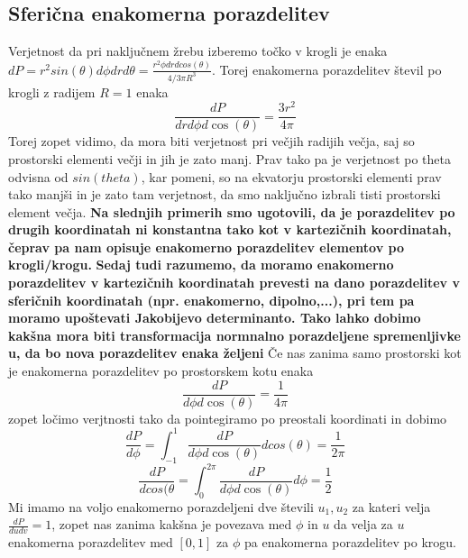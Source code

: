 \documentclass[11pt, a4paper]{article}
\begin{document}
\subsection{Sferična enakomerna porazdelitev}
Verjetnost da pri naključnem žrebu izberemo točko v krogli je enaka $dP  = r^2 sin ( \theta ) d \phi dr d \theta =\frac{ r^2 \phi dr d cos( \theta)} {4/3 \pi R^3} $. Torej enakomerna porazdelitev števil po krogli z radijem $R=1$ enaka 
\begin{equation}
\frac{dP}{dr d \phi  d \cos( \theta )}  = \frac{3 r^2}{4 \pi}
\end{equation} 
Torej zopet vidimo, da mora biti verjetnost pri večjih radijih večja, saj so prostorski elementi večji in jih je zato manj. Prav tako pa je verjetnost po theta odvisna od $sin(theta)$, kar pomeni, so na ekvatorju prostorski elementi prav tako manjši in je zato tam verjetnost, da smo naključno izbrali tisti prostorski element večja. \newline\newline
\textbf{Na slednjih primerih smo ugotovili, da je porazdelitev po drugih koordinatah ni konstantna tako kot v kartezičnih koordinatah, čeprav pa nam opisuje enakomerno porazdelitev elementov po krogli/krogu.}\newline\newline
\textbf{Sedaj tudi razumemo, da moramo enakomerno porazdelitev v kartezičnih koordinatah prevesti na dano porazdelitev v sferičnih koordinatah (npr. enakomerno, dipolno,...), pri tem pa moramo upoštevati Jakobijevo determinanto. Tako lahko dobimo kakšna mora biti transformacija normnalno porazdeljene spremenljivke u, da bo nova porazdelitev enaka željeni}\newline\newline
Če nas zanima samo prostorski kot je enakomerna porazdelitev po prostorskem kotu enaka 
\begin{equation}
\frac{dP}{d \phi d \cos( \theta )} = \frac{1}{4 \pi}
\end{equation}
zopet ločimo verjtnosti tako da pointegiramo po preostali koordinati in dobimo
\begin{equation}
\frac{dP}{d \phi} = \int_{-1}^{1}\frac{dP}{d \phi d \cos( \theta )} d cos( \theta) = \frac{1}{2 \pi}
\end{equation}
\begin{equation}
\frac{dP}{d cos( \theta} = \int_{0}^{2 \pi} \frac{dP}{d \phi d \cos( \theta )} d \phi = \frac{1}{2}
\end{equation}
Mi imamo na voljo enakomerno porazdeljeni dve števili $u_1,u_2$ za kateri velja $\frac{dP}{dudv} = 1$, zopet nas zanima kakšna je povezava med $\phi $ in $u$ da velja za $u$ enakomerna porazdelitev med $[0,1]$ za $\phi$ pa enakomerna porazdelitev po krogu.
\end{document}
